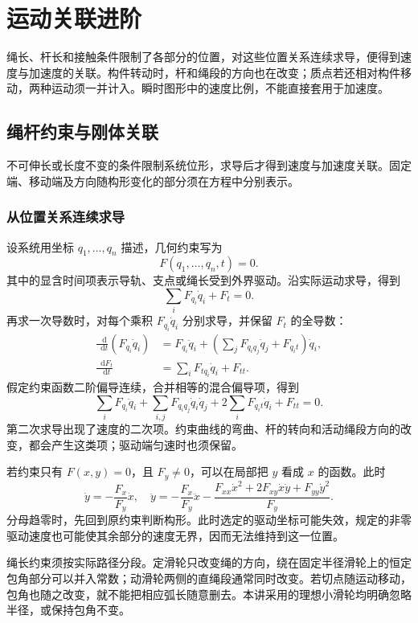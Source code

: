 \documentclass[11pt,openany,fontset=fandol]{ctexbook}
\theoremstyle{definition}\newtheorem{example}{例}[chapter]\newtheorem{exercise}{习题}[chapter]
\newcommand{\dd}{\mathop{}\!\mathrm d}\newcommand{\ee}{\mathrm e}\newcommand{\vct}[1]{\bm{#1}}
\begin{document}
\chapter{运动关联进阶}

绳长、杆长和接触条件限制了各部分的位置，对这些位置关系连续求导，便得到速度与加速度的关联。构件转动时，杆和绳段的方向也在改变；质点若还相对构件移动，两种运动须一并计入。瞬时图形中的速度比例，不能直接套用于加速度。


\section{绳杆约束与刚体关联}
不可伸长或长度不变的条件限制系统位形，求导后才得到速度与加速度关联。固定端、移动端及方向随构形变化的部分须在方程中分别表示。

\subsection{从位置关系连续求导}
设系统用坐标 $q_1,\ldots,q_n$ 描述，几何约束写为
\[
F(q_1,\ldots,q_n,t)=0.
\]
其中的显含时间项表示导轨、支点或绳长受到外界驱动。沿实际运动求导，得到
\[
\sum_i F_{q_i}\dot q_i+F_t=0.
\]
再求一次导数时，对每个乘积 $F_{q_i}\dot q_i$ 分别求导，并保留 $F_t$ 的全导数：
\[
\begin{aligned}
\frac{\dd}{\dd t}(F_{q_i}\dot q_i)
&=F_{q_i}\ddot q_i+
\left(\sum_jF_{q_iq_j}\dot q_j+F_{q_it}\right)\dot q_i,\\
\frac{\dd F_t}{\dd t}&=\sum_iF_{tq_i}\dot q_i+F_{tt}.
\end{aligned}
\]
假定约束函数二阶偏导连续，合并相等的混合偏导项，得到
\[
\sum_i F_{q_i}\ddot q_i
+\sum_{i,j}F_{q_iq_j}\dot q_i\dot q_j
+2\sum_iF_{q_it}\dot q_i+F_{tt}=0.
\]
第二次求导出现了速度的二次项。约束曲线的弯曲、杆的转向和活动绳段方向的改变，都会产生这类项；驱动端匀速时也须保留。

若约束只有 $F(x,y)=0$，且 $F_y\ne0$，可以在局部把 $y$ 看成 $x$ 的函数。此时
\[
\dot y=-\frac{F_x}{F_y}\dot x,
\quad
\ddot y=-\frac{F_x}{F_y}\ddot x
-\frac{F_{xx}\dot x^2+2F_{xy}\dot x\dot y+F_{yy}\dot y^2}{F_y}.
\]
分母趋零时，先回到原约束判断构形。此时选定的驱动坐标可能失效，规定的非零驱动速度也可能使其余部分的速度无界，因而无法维持到这一位置。

绳长约束须按实际路径分段。定滑轮只改变绳的方向，绕在固定半径滑轮上的恒定包角部分可以并入常数；动滑轮两侧的直绳段通常同时改变。若切点随运动移动，包角也随之改变，就不能把相应弧长随意删去。本讲采用的理想小滑轮均明确忽略半径，或保持包角不变。
\end{document}
